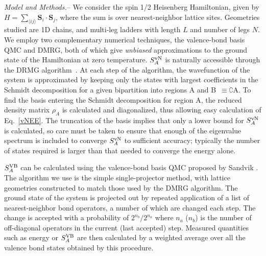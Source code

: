 \documentclass[prl,aps,twocolumn,floatfix,amsmath,amssymb,superscriptaddress,tightenlines]{revtex4}
\begin{document}
{\it Model and Methods.}-- We consider the spin 1/2 Heisenberg
Hamiltonian, given by  $H =  \sum_{\langle i j \rangle} {\mathbf S}_i
\cdot {\mathbf S}_j \label{ham}$, where the sum is over nearest-neighbor lattice
sites.  Geometries studied are 1D chains, and multi-leg ladders with
length $L$ and number of legs $N$.  
We employ two complementary numerical techniques, the valence-bond basis QMC and DMRG, both of
which give {\it unbiased} approximations to the ground state of the
Hamiltonian at zero temperature.  $S^{ \rm vN}_A$ is naturally accessible
through the DRMG 
algorithm~\cite{White92}.  At each
step of the algorithm, the wavefunction of the system is approximated by
keeping only the states with largest coefficients in the Schmidt
decomposition for a given bipartition into regions A and
B~$\equiv\complement$A. To find the
basis entering the Schmidt decomposition for region A, the reduced
density matrix $\rho_A$ is calculated and diagonalized, thus allowing easy
calculation of Eq.~\eqref{vNEE}. The truncation of the basis implies that
only a lower bound for $S^{\rm vN}_A$ is calculated, so care must be taken
to ensure that enough of the eigenvalue spectrum is included to converge
$S^{ \rm vN}_A$ to sufficient accuracy; typically the number of states required
is larger than that needed to converge the energy alone.

$S^{\rm VB}_A$ \cite{Alet,Chh} can be calculated using the valence-bond basis
QMC proposed by Sandvik \cite{Sandvik}.  The 
algorithm we use is the simple single-projector method, with lattice
geometries constructed to match those used by the DMRG algorithm.  The
ground state of the system is projected out by repeated application of a
list of nearest-neighbor bond operators,
a number
of which are changed each step.  The change is accepted
with a probability of $2^{n_{b}}/2^{n_{a}} $ where $n_{a}$ ($n_{b}$)
is the number of off-diagonal operators in the current (last accepted) step.
Measured quantities such as energy or $S^{\rm VB}_A$ are then calculated 
by a weighted average over all the valence bond
states obtained by this procedure.
\end{document}
